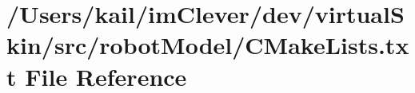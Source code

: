 \hypertarget{src_2robot_model_2_c_make_lists_8txt}{
\section{/Users/kail/imClever/dev/virtualSkin/src/robotModel/CMakeLists.txt File Reference}
\label{src_2robot_model_2_c_make_lists_8txt}
}
